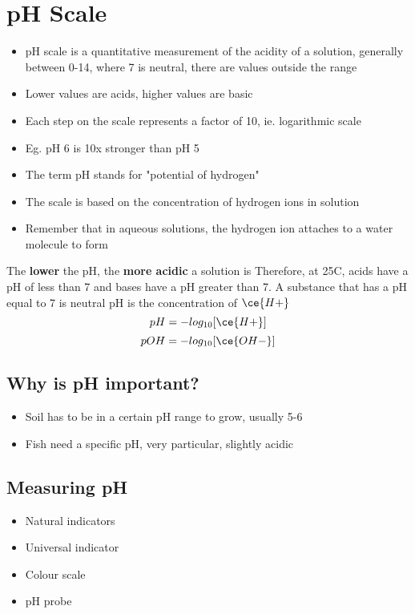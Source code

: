 \newpage

\section{pH Scale} \label{17/02/2025}
	\begin{itemize}
		\item pH scale is a quantitative measurement of the acidity of a solution, generally between 0-14, where 7 is neutral, there are values outside the range
		\item Lower values are acids, higher values are basic
		\item Each step on the scale represents a factor of 10, ie. logarithmic scale
		\item Eg. pH 6 is 10x stronger than pH 5
		\item The term pH stands for "potential of hydrogen"
		\item The scale is based on the concentration of hydrogen ions in solution
		\item Remember that in aqueous solutions, the hydrogen ion attaches to a water molecule to form
	\end{itemize}
	The \textbf{lower} the pH, the \textbf{more acidic} a solution is
	Therefore, at 25\degree C, acids have a pH of less than 7 and bases have a pH greater than 7. A substance that has a pH equal to 7 is neutral
	pH is the concentration of $\ce{H+}$
	$$pH = -log_{10}{[\ce{H+}]}$$
	$$pOH = -log_{10}{[\ce{OH-}]}$$
	
	\subsection{Why is pH important?}
		\begin{itemize}
			\item Soil has to be in a certain pH range to grow, usually 5-6
			\item Fish need a specific pH, very particular, slightly acidic
		\end{itemize}
	
	\subsection{Measuring pH}
		\begin{itemize}
			\item Natural indicators
			\item Universal indicator
			\item Colour scale
			\item pH probe
		\end{itemize}
	

